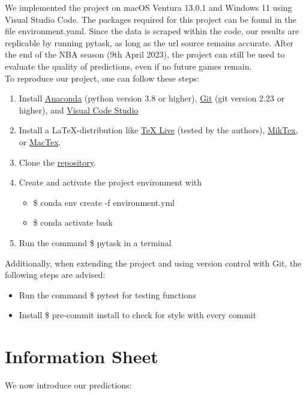 \documentclass[11pt, a4paper, leqno]{article}
\begin{document}
We implemented the project on macOS Ventura 13.0.1 and Windows 11 using Visual Studio Code. The packages required for this project can be found in the file environment.yaml.
Since the data is scraped within the code, our results are replicable by running pytask, as long as the url source remains accurate.
After the end of the NBA season (9th April 2023), the project can still be used to evaluate the quality of predictions, even if no future games remain.\\
To reproduce our project, one can follow these steps:
\begin{enumerate}
    \item Install \href{https://docs.anaconda.com/anaconda/install/index.html}{Anaconda} (python version 3.8 or higher), \href{https://git-scm.com/}{Git} (git version 2.23 or higher), and \href{https://code.visualstudio.com/download}{Visual Code Studio}
    \item Install a \LaTeX-distribution like  \href{https://www.tug.org/texlive/}{TeX Live} (tested by the authors), \href{https://miktex.org/}{MikTex}, or \href{https://tug.org/mactex/}{MacTex}.
    \item Clone the \href{https://github.com/NormProgr/basketball_predict}{repository}.
    \item Create and activate the project environment with
        \begin{itemize}
            \item \$ conda env create -f environment.yml
            \item \$ conda activate bask
        \end{itemize}
    \item Run the command \$ pytask in a terminal
\end{enumerate}

Additionally, when extending the project and using version control with Git, the following steps are advised:
\begin{itemize}
    \item Run the command \$ pytest for testing functions
    \item Install \$ pre-commit install to check for style with every commit
\end{itemize}

\clearpage
\section{Information Sheet}

We now introduce our predictions:
\end{document}
